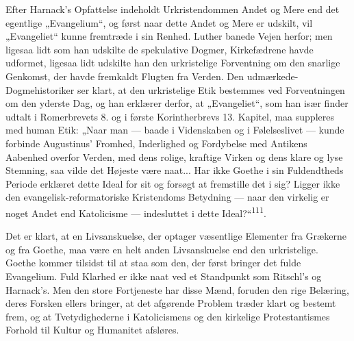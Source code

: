 \documentclass[12pt,a4paper,openany]{book}
\begin{document}
Efter Harnack’s Opfattelse indeholdt Urkristendommen Andet og Mere end
det egentlige „Evangelium“, og først naar dette Andet og Mere er
udskilt, vil „Evangeliet“ kunne fremtræde i sin Renhed. Luther banede
Vejen herfor; men ligesaa lidt som han udskilte de spekulative Dogmer,
Kirkefædrene havde udformet, ligesaa lidt udskilte han den urkristelige
Forventning om den snarlige Genkomst, der havde fremkaldt Flugten fra
Verden. Den udmærkede-Dogmehistoriker ser klart, at den urkristelige
Etik bestemmes ved Forventningen om den yderste Dag, og han erklærer
derfor, at „Evangeliet“, som han især finder udtalt i Romerbrevets 8. og
i første Korintherbrevs 13. Kapitel, maa suppleres med human Etik: „Naar
man --- baade i Videnskaben og i Følelseslivet --- kunde forbinde
Augustinus’ Fromhed, Inderlighed og Fordybelse med Antikens Aabenhed
overfor Verden, med dens rolige, kraftige Virken og dens klare og lyse
Stemning, saa vilde det Højeste være naat... Har ikke Goethe i sin
Fuldendtheds Periode erklæret dette Ideal for sit og forsøgt at
fremstille det i sig? Ligger ikke den evangelisk-reformatoriske
Kristendoms Betydning --- naar den virkelig er noget Andet end
Katolicisme --- indesluttet i dette Ideal?“\textsuperscript{111}.

Det er klart, at en Livsanskuelse, der optager væsentlige Elementer fra
Grækerne og fra Goethe, maa være en helt anden Livsanskuelse end den
urkristelige. Goethe kommer tilsidst til at staa som den, der først
bringer det fulde Evangelium. Fuld Klarhed er ikke naat ved et
Standpunkt som Ritschl’s og Harnack’s. Men den store Fortjeneste har
disse Mænd, foruden den rige Belæring, deres Forsken ellers bringer, at
det afgørende Problem træder klart og bestemt frem, og at
Tvetydighederne i Katolicismens og den kirkelige Protestantismes Forhold
til Kultur og Humanitet afsløres.
\end{document}
